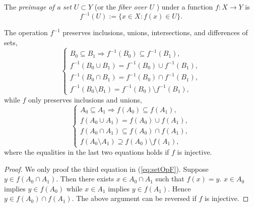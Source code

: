 \begin{defn}
  \label{def:preimage}
  The \emph{preimage of a set $U\subset Y$}
  (or the \emph{fiber over $U$ })
  under a function $f: X\rightarrow Y$ is 
   \begin{equation}
     \label{eq:preimage}
     f^{-1}(U) := \{ x\in X: f(x)\in U\}.
   \end{equation}
\end{defn}

\begin{lem}
  \label{lem:setOpPreservation}
  The operation $f^{-1}$ preserves inclusions,
  unions, intersections, and differences of sets, 
  \begin{equation}
    \label{eq:setOpFpre}
    \left\{
      \begin{array}{l}
        B_0\subseteq B_1 \Rightarrow f^{-1}(B_0)\subseteq f^{-1}(B_1),
        \\
        f^{-1}(B_0\cup B_1) = f^{-1}(B_0) \cup f^{-1}(B_1),
        \\
        f^{-1}(B_0\cap B_1) = f^{-1}(B_0) \cap f^{-1}(B_1),
        \\
        f^{-1}(B_0\setminus B_1) = f^{-1}(B_0) \setminus f^{-1}(B_1), 
      \end{array}
    \right .
  \end{equation}
  while $f$ only preserves inclusions and unions, 
  \begin{equation}
    \label{eq:setOpF}
    \left\{
      \begin{array}{l}
        A_0\subseteq A_1 \Rightarrow f(A_0)\subseteq f(A_1),
        \\
        f(A_0\cup A_1) = f(A_0) \cup f(A_1),
        \\
        f(A_0\cap A_1) \subseteq f(A_0) \cap f(A_1),
        \\
        f(A_0\setminus A_1) \supseteq f(A_0) \setminus f(A_1),
      \end{array}
    \right .
  \end{equation}
  where the equalities in the last two equations holds
  if $f$ is injective.
\end{lem}
\begin{proof}
  We only proof the third equation in (\ref{eq:setOpF}).
  Suppose $y\in f(A_0\cap A_1)$.
  Then there exists $x\in A_0\cap A_1$ such that $f(x)=y$.
   $x\in A_0$ implies $y\in f(A_0)$
   while $x\in A_1$ implies $y\in f(A_1)$.
  Hence $y\in f(A_0)\cap f(A_1)$.
  The above argument can be reversed if $f$ is injective.
\end{proof}

